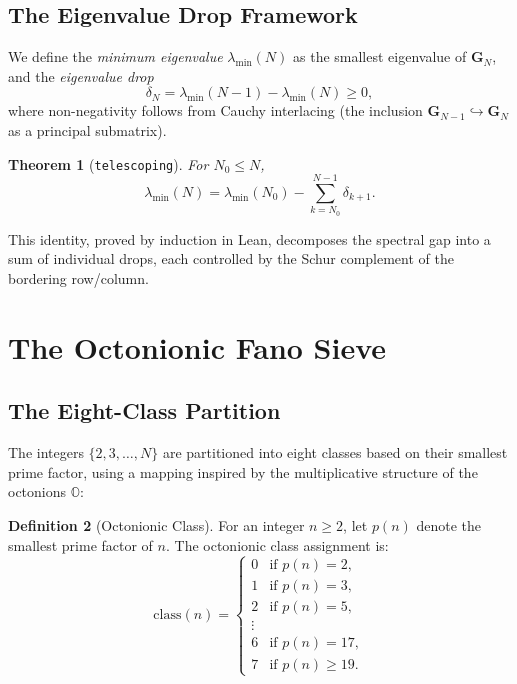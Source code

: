 \documentclass[11pt,a4paper]{article}
\newtheorem{theorem}{Theorem}[section]
\theoremstyle{definition}
\newtheorem{definition}[theorem]{Definition}
\theoremstyle{remark}
\newcommand{\Gram}{\mathbf{G}}
\newcommand{\lmin}{\lambda_{\min}}
\newcommand{\lean}[1]{\texttt{#1}}
\begin{document}
\subsection{The Eigenvalue Drop Framework}

We define the \emph{minimum eigenvalue} $\lmin(N)$ as the smallest
eigenvalue of $\Gram_N$, and the \emph{eigenvalue drop}
\[
  \delta_N = \lmin(N-1) - \lmin(N) \geq 0,
\]
where non-negativity follows from Cauchy interlacing (the inclusion
$\Gram_{N-1} \hookrightarrow \Gram_N$ as a principal submatrix).

\begin{theorem}[\lean{telescoping}]\label{thm:telescoping}
For $N_0 \leq N$,
\[
  \lmin(N) = \lmin(N_0) - \sum_{k=N_0}^{N-1} \delta_{k+1}.
\]
\end{theorem}

This identity, proved by induction in Lean, decomposes the spectral gap
into a sum of individual drops, each controlled by the Schur complement
of the bordering row/column.

\section{The Octonionic Fano Sieve}\label{sec:octonion}

\subsection{The Eight-Class Partition}

The integers $\{2, 3, \ldots, N\}$ are partitioned into eight classes
based on their smallest prime factor, using a mapping inspired by the
multiplicative structure of the octonions $\mathbb{O}$:

\begin{definition}[Octonionic Class]\label{def:octclass}
For an integer $n \geq 2$, let $p(n)$ denote the smallest prime factor
of $n$. The octonionic class assignment is:
\[
  \mathrm{class}(n) = \begin{cases}
    0 & \text{if } p(n) = 2, \\
    1 & \text{if } p(n) = 3, \\
    2 & \text{if } p(n) = 5, \\
    \vdots \\
    6 & \text{if } p(n) = 17, \\
    7 & \text{if } p(n) \geq 19.
  \end{cases}
\]
\end{definition}
\end{document}
